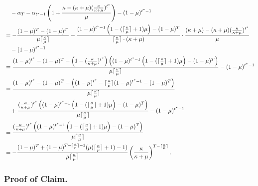 \begin{enumerate}
    \begin{align*}
        &\quad  -  \alpha_T - \alpha_{t^*-1} \left( 1 + \frac{\kappa - (\kappa + \mu)(\frac{\kappa}{\kappa + \mu})^{t^*}}{\mu} \right) - (1-\mu)^{t^*-1}\\
        &=- \frac{ (1-\mu)^T - (1-\mu)^{t^*} }{\mu \lceil \frac{\kappa}{\mu}\rceil} - \frac{(1-\mu)^{t^*-1} \left(1 - (\lceil \frac{\kappa}{\mu}\rceil+1)\mu \right) - (1-\mu)^T}{\lceil \frac{\kappa}{\mu} \rceil \cdot (\kappa+\mu)} \cdot \frac{(\kappa+\mu)- (\kappa + \mu)(\frac{\kappa}{\kappa + \mu})^{t^*}}{\mu} \\
        &\quad - (1-\mu)^{t^*-1}\\
        &=  \frac{(1-\mu)^{t^*} - (1-\mu)^T - \left(1- (\frac{\kappa}{\kappa + \mu})^{t^*}\right) \left((1-\mu)^{t^*-1} \left(1 - (\lceil \frac{\kappa}{\mu}\rceil+1)\mu \right) - (1-\mu)^T \right)}{\mu \lceil \frac{\kappa}{\mu}\rceil} - (1-\mu)^{t^*-1}\\
        &= \frac{(1-\mu)^{t^*} - (1-\mu)^T - \left( (1-\mu)^{t^*} - \lceil \frac{\kappa}{\mu} \rceil (1-\mu)^{t^*-1} - (1-\mu)^T \right)}{\mu \lceil \frac{\kappa}{\mu}\rceil}\\
        &\quad  + \frac{ (\frac{\kappa}{\kappa + \mu})^{t^*} \left((1-\mu)^{t^*-1} \left(1 - (\lceil \frac{\kappa}{\mu}\rceil+1)\mu \right) - (1-\mu)^T \right)}{\mu \lceil \frac{\kappa}{\mu} \rceil} - (1-\mu)^{t^*-1}\\
        &= \frac{ (\frac{\kappa}{\kappa + \mu})^{t^*} \left((1-\mu)^{t^*-1} \left(1 - (\lceil \frac{\kappa}{\mu}\rceil+1)\mu \right) - (1-\mu)^T \right)}{\mu \lceil \frac{\kappa}{\mu} \rceil}\\
        &= - \frac{(1-\mu)^T + (1-\mu)^{T - \lceil \frac{\kappa}{\mu}\rceil - 1} (\mu ( \lceil \frac{\kappa}{\mu} \rceil+1) -1)}{ \mu \lceil \frac{\kappa}{\mu}\rceil} \left(\frac{\kappa}{\kappa + \mu} \right)^{T - \lceil \frac{\kappa}{\mu}\rceil}. 
    \end{align*}
    \hfill \Halmos
    \end{enumerate}


\subsubsection*{Proof of Claim.}

